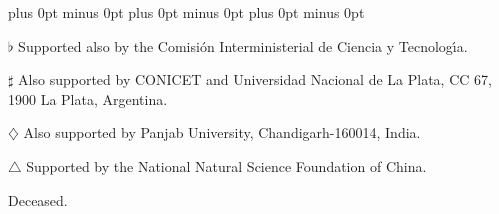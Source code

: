 \documentclass[12pt,a4paper,dvips]{article}
\begin{document}
{\begin{list}{A}{\itemsep=0pt plus 0pt minus 0pt\parsep=0pt plus 0pt minus 0pt
                \topsep=0pt plus 0pt minus 0pt}
\item[$\flat$] Supported also by the Comisi\'on Interministerial de Ciencia y 
        Tecnolog{\'\i}a.
\item[$\sharp$] Also supported by CONICET and Universidad Nacional de La Plata,
        CC 67, 1900 La Plata, Argentina.
\item[$\diamondsuit$] Also supported by Panjab University, Chandigarh-160014, 
        India.
\item[$\triangle$] Supported by the National Natural Science
  Foundation of China.
\item[\dag] Deceased.
\end{list}
}
\vfill







\newpage

\end{document}
